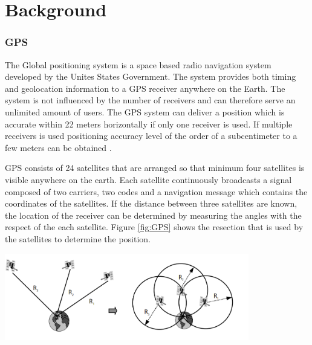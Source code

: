 

\chapter{Background}



\subsection{GPS}
The Global positioning system is a space based radio navigation system developed by the Unites States Government.  The system provides both timing and geolocation information to a GPS receiver anywhere on the Earth.  The system is not influenced by the number of receivers and can therefore serve an unlimited amount of users. The GPS system can deliver a position which is accurate within 22 meters horizontally if only one receiver is used. If multiple receivers is used positioning accuracy level of the order of a subcentimeter to a few meters can be obtained \cite{GPS}.

GPS consists of 24 satellites that are arranged so that minimum four satellites is visible anywhere on the earth. Each satellite continuously broadcasts a signal composed of two carriers, two codes and a navigation message which contains the coordinates of the satellites.  If the distance between three satellites are known, the location of the receiver can be determined by measuring the angles with the respect of the each satellite.  Figure \ref{fig:GPS} shows the resection that is used by the satellites to determine the position.\\

\begin{minipage}[t]{0.8\textwidth}
\centering
    \includegraphics[width=0.8\textwidth]{Images/gps.PNG}\\
    \captionsetup{justification=centering}
    \label{fig:GPS}
\end{minipage}


